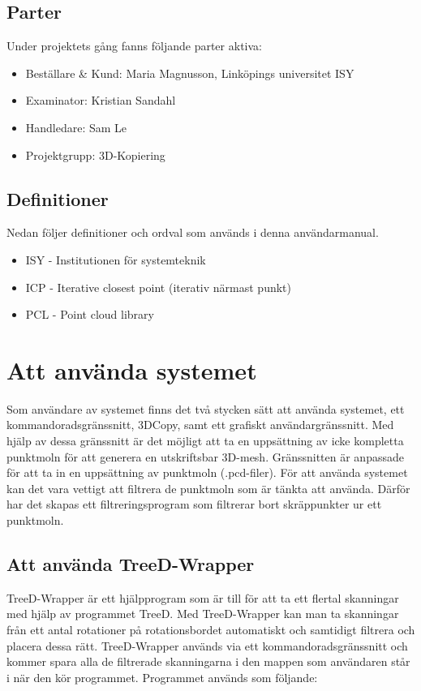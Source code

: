 \documentclass[a4paper,titlepage,12pt]{article}
\begin{document}
	\subsection{Parter}
		Under projektets gång fanns följande parter aktiva:
		
		\begin{itemize}
			\item Beställare \& Kund: Maria Magnusson, Linköpings universitet ISY
			\item Examinator: Kristian Sandahl
			\item Handledare: Sam Le
			\item Projektgrupp: 3D-Kopiering
		\end{itemize}
		
	\subsection{Definitioner}
		Nedan följer definitioner och ordval som används i denna användarmanual.
		
		\begin{itemize}
			\item ISY - Institutionen för systemteknik
			\item ICP - Iterative closest point (iterativ närmast punkt)
			\item PCL - Point cloud library
		\end{itemize}
    
\newpage  

\section{Att använda systemet}
	Som användare av systemet finns det två stycken sätt att använda systemet, ett kommandoradsgränssnitt, 3DCopy, samt ett grafiskt användargränssnitt. Med hjälp av dessa gränssnitt är det möjligt att ta en uppsättning av icke kompletta punktmoln för att generera en utskriftsbar 3D-mesh. Gränssnitten är anpassade för att ta in en uppsättning av punktmoln (.pcd-filer). För att använda systemet kan det vara vettigt att filtrera de punktmoln som är tänkta att använda. Därför har det skapas ett filtreringsprogram som filtrerar bort skräppunkter ur ett punktmoln.
	
	\subsection{Att använda TreeD-Wrapper}
	TreeD-Wrapper är ett hjälpprogram som är till för att ta ett flertal skanningar med hjälp av programmet TreeD. Med TreeD-Wrapper kan man ta skanningar från ett antal rotationer på rotationsbordet automatiskt och samtidigt filtrera och placera dessa rätt. TreeD-Wrapper används via ett kommandoradsgränssnitt och kommer spara alla de filtrerade skanningarna i den mappen som användaren står i när den kör programmet. Programmet används som följande:
	
\end{document}

